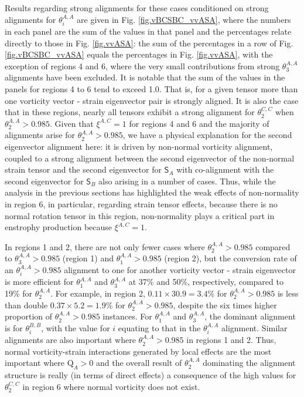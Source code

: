 \documentclass[preprint,amssymb,amsmath,aip,cha]{revtex4-1}
\begin{document}
Results regarding strong alignments for these cases conditioned on strong alignments for $\theta^{A,A}_{i}$ are given in Fig. \ref{fig.vBCSBC_vvASA}, where the numbers in each panel are the sum of the values in that panel and the percentages relate directly to those in Fig. \ref{fig.vvASA}: the sum of the percentages in a row of Fig. \ref{fig.vBCSBC_vvASA} equals the percentages in Fig. \ref{fig.vvASA}, with the exception of regions 4 and 6, where the very small contributions from strong $\theta_{3}^{A,A}$ alignments have been excluded. It is notable that the sum of the values in the panels for regions 4 to 6 tend to exceed 1.0. That is, for a given tensor more than one vorticity vector - strain eigenvector pair is strongly aligned. It is also the case that in these regions, nearly all tensors exhibit a strong alignment for $\theta^{C,C}_{2}$ when $\theta^{A,A}_{2} > 0.985$. Given that $\xi^{A,C} = 1$ for regions 4 and 6 and the majority of alignments arise for $\theta^{A,A}_{2} > 0.985$, we have a physical explanation for the second eigenvector alignment here: it is driven by non-normal vorticity alignment, coupled to a strong alignment between the second eigenvector of the non-normal strain tensor and the second eigenvector for $\mathsf{S}_{A}$ with co-alignment with the second eigenvector for $\mathsf{S}_{B}$ also arising in a number of cases. Thus, while the analysis in the previous sections has highlighted the weak effects of non-normality in region 6, in particular, regarding strain tensor effects, because there is no normal rotation tensor in this region, non-normality plays a critical part in enstrophy production because $\xi^{A,C} = 1$.

In regions 1 and 2, there are not only fewer cases where $\theta^{A,A}_{2} > 0.985$ compared to $\theta^{A,A}_{3} > 0.985$ (region 1) and $\theta^{A,A}_{1} > 0.985$ (region 2), but the conversion rate of an $\theta^{A,A}_{i} > 0.985$ alignment to one for another vorticity vector - strain eigenvector is more efficient for $\theta^{A,A}_{1}$ and $\theta^{A,A}_{3}$ at 37\% and 50\%, respectively, compared to 19\% for $\theta^{A,A}_{2}$. For example, in region 2, $0.11 \times 30.9 = 3.4$\% for $\theta^{A,A}_{2} > 0.985$ is less than double $0.37 \times 5.2 = 1.9$\% for $\theta^{A,A}_{2} > 0.985$, despite the six times higher proportion of $\theta^{A,A}_{2} > 0.985$ instances. For $\theta^{A,A}_{1}$ and $\theta^{A,A}_{3}$, the dominant alignment is for $\theta^{B,B}_{i}$, with the value for $i$ equating to that in the $\theta^{A,A}_{i}$ alignment. Similar alignments are also important where $\theta^{A,A}_{2} > 0.985$ in regions 1 and 2. Thus, normal vorticity-strain interactions generated by local effects are the most important where $\mbox{Q}_{A} > 0$ and the overall result of $\theta^{A,A}_{2}$ dominating the alignment structure is really (in terms of direct effects) a consequence of the high values for $\theta^{C,C}_{2}$ in region 6 where normal vorticity does not exist.
\end{document}
